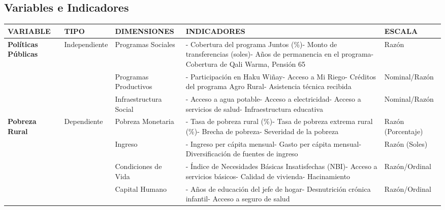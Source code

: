 \documentclass[
  man,
  floatsintext,
  longtable,
  a4paper,
  nolmodern,
  notxfonts,
  notimes,
  12pt,
  colorlinks=true,linkcolor=blue,citecolor=blue,urlcolor=blue]{apa7}
\newcounter{none} %
\begin{document}
\subsection{Variables e Indicadores}\label{variables-e-indicadores-7}

{\def\LTcaptype{none} %
\begin{longtable}[]{@{}
  >{\raggedright\arraybackslash}p{}
  >{\raggedright\arraybackslash}p{}
  >{\raggedright\arraybackslash}p{}
  >{\raggedright\arraybackslash}p{}
  >{\raggedright\arraybackslash}p{}@{}}
\toprule\noalign{}
\begin{minipage}[b]{\linewidth}\raggedright
VARIABLE
\end{minipage} & \begin{minipage}[b]{\linewidth}\raggedright
TIPO
\end{minipage} & \begin{minipage}[b]{\linewidth}\raggedright
DIMENSIONES
\end{minipage} & \begin{minipage}[b]{\linewidth}\raggedright
INDICADORES
\end{minipage} & \begin{minipage}[b]{\linewidth}\raggedright
ESCALA
\end{minipage} \\
\midrule\noalign{}
\endhead
\bottomrule\noalign{}
\endlastfoot
\textbf{Políticas Públicas} & Independiente & Programas Sociales & -
Cobertura del programa Juntos (\%)- Monto de transferencias (soles)-
Años de permanencia en el programa- Cobertura de Qali Warma, Pensión 65
& Razón \\
& & Programas Productivos & - Participación en Haku Wiñay- Acceso a Mi
Riego- Créditos del programa Agro Rural- Asistencia técnica recibida &
Nominal/Razón \\
& & Infraestructura Social & - Acceso a agua potable- Acceso a
electricidad- Acceso a servicios de salud- Infraestructura educativa &
Nominal/Razón \\
\textbf{Pobreza Rural} & Dependiente & Pobreza Monetaria & - Tasa de
pobreza rural (\%)- Tasa de pobreza extrema rural (\%)- Brecha de
pobreza- Severidad de la pobreza & Razón (Porcentaje) \\
& & Ingreso & - Ingreso per cápita mensual- Gasto per cápita mensual-
Diversificación de fuentes de ingreso & Razón (Soles) \\
& & Condiciones de Vida & - Índice de Necesidades Básicas Insatisfechas
(NBI)- Acceso a servicios básicos- Calidad de vivienda- Hacinamiento &
Razón/Ordinal \\
& & Capital Humano & - Años de educación del jefe de hogar- Desnutrición
crónica infantil- Acceso a seguro de salud & Razón/Ordinal \\
\end{longtable}
}
\end{document}
